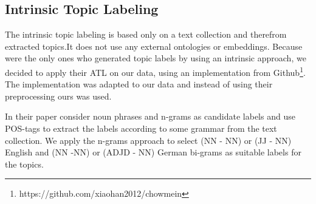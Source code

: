 \subsection{Intrinsic Topic Labeling}
\label{sec:intrinsic}
The intrinsic topic labeling is based only on a text collection and therefrom extracted topics.It does not use any external ontologies or embeddings. Because \textit{\cite{Mei2007}} were the only ones who generated topic labels by using an intrinsic approach, we decided to apply their \ac{ATL} on our data, using an implementation from Github\footnote{https://github.com/xiaohan2012/chowmein}. The implementation was adapted to our data and instead of using their preprocessing ours was used.

In their paper \textit{\cite{Mei2007}} consider noun phrases and n-grams as candidate labels and use \acf{POS}-tags to extract the labels according to some grammar from the text collection. We apply the n-grams approach to select (NN - NN) or (JJ - NN) English and (NN -NN) or (ADJD - NN) German bi-grams as suitable labels for the topics.

